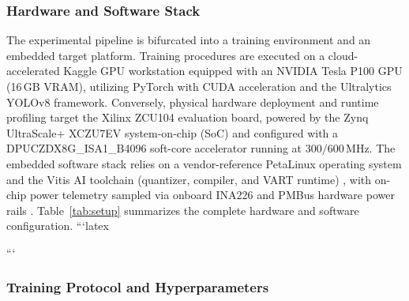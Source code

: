 \documentclass[algorithms,article,submit,moreauthors]{Definitions/mdpi}
\newcommand{\rev}[1]{\textcolor{revcolor}{#1}}
\begin{document}
\subsubsection{Hardware and Software Stack}

The experimental pipeline is bifurcated into a training environment and an embedded target platform. Training procedures are executed on a cloud-accelerated Kaggle GPU workstation equipped with an NVIDIA Tesla P100 GPU (16\,GB VRAM), utilizing PyTorch with CUDA acceleration and the Ultralytics YOLOv8 framework. Conversely, physical hardware deployment and runtime profiling target the Xilinx ZCU104 evaluation board, powered by the Zynq UltraScale+ XCZU7EV system-on-chip (SoC) \citep{bib2} and configured with a DPUCZDX8G\_ISA1\_B4096 soft-core accelerator running at $300/600\,$MHz. The embedded software stack relies on a vendor-reference PetaLinux operating system and the Vitis AI toolchain (quantizer, compiler, and VART runtime) \citep{bib1}, with on-chip power telemetry sampled via onboard INA226 and PMBus hardware power rails \citep{bib3}. Table~\ref{tab:setup} summarizes the complete hardware and software configuration.
```latex
\begin{table}[h!]
\centering
\caption{\rev{Hardware and software configuration for training and edge deployment.}}
\label{tab:setup}
\end{table}
```

\subsubsection{Training Protocol and Hyperparameters}
\end{document}
